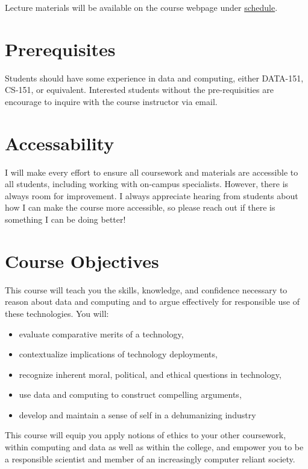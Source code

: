 \documentclass[11pt]{article}
\begin{document}
Lecture materials will be available on the course webpage under \href{https://cd-public.github.io/courses/eth/sched.html}{schedule}.



\section*{Prerequisites}

Students should have some experience in data and computing, either DATA-151, CS-151, or equivalent. Interested students without the pre-requisities are encourage to inquire with the course instructor via email.

\section*{Accessability}

I will make every effort to ensure all coursework and materials are accessible to all students, including working with on-campus specialists. However, there is always room for improvement. I always appreciate hearing from students about how I can make the course more accessible, so please reach out if there is something I can be doing better!


\section*{Course Objectives}
This course will teach you the skills, knowledge, and confidence necessary to reason about data and computing and to argue effectively for responsible use of these technologies. You will:
\begin{itemize}
\item    evaluate comparative merits of a technology,
\item    contextualize implications of technology deployments,
\item    recognize inherent moral, political, and ethical questions in technology,
\item    use data and computing to construct compelling arguments,
\item    develop and maintain a sense of self in a dehumanizing industry
\end{itemize}
This course will equip you apply notions of ethics to your other coursework, within computing and data as well as within the college, and empower you to be a responsible scientist and member of an increasingly computer reliant society.
\end{document}
